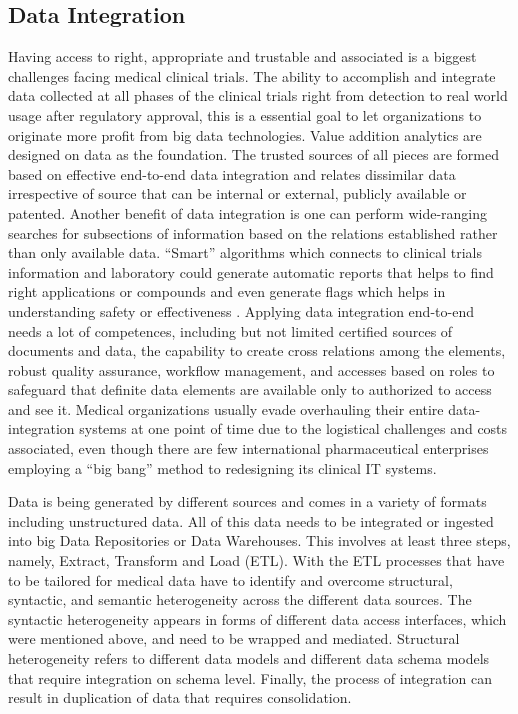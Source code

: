 \documentclass[sigconf]{acmart}
\begin{document}
\subsection{Data Integration}
Having access to right, appropriate and trustable and associated is a 
biggest challenges facing medical clinical trials. The
ability to accomplish and integrate data collected at all phases of the
clinical trials right from detection to real world usage after regulatory 
approval, this is a essential goal to let organizations to originate
more profit from big data technologies. Value addition analytics are designed
on data as the foundation.  The trusted sources of all pieces are formed 
based on effective end-to-end data integration and relates dissimilar data
irrespective of source that can be internal or external, publicly available or patented.
Another benefit of data integration is one can perform wide-ranging 
searches for subsections of information based on the relations established 
rather than only available data.  ``Smart'' algorithms which connects 
to clinical trials information and laboratory could generate automatic
reports that helps to find right applications or compounds and even 
generate flags which helps in understanding safety or effectiveness
\cite{TR02}.
Applying data integration end-to-end needs a lot of competences,
including but not limited certified sources of documents
and data, the capability to create cross relations among the elements, 
robust quality assurance, workflow management, and accesses based 
on roles to safeguard that definite data elements are available only 
to authorized to access and see it. Medical organizations usually evade
overhauling their entire data-integration systems at one point of time
due to the logistical challenges and costs associated, even though
there are few  international pharmaceutical enterprises employing 
a ``big bang'' method to redesigning its clinical IT systems\cite{TR02}.


Data is being generated by different sources and comes in a variety
of formats including unstructured data. All of this data needs to 
be integrated or ingested into big Data Repositories or Data 
Warehouses. This involves at least three steps, namely, Extract, 
Transform and Load (ETL). With the ETL processes that have to be 
tailored for medical data have to identify and overcome structural,
syntactic, and semantic heterogeneity across the different data 
sources. The syntactic heterogeneity appears in forms of different 
data access interfaces, which were mentioned above, and need to be
wrapped and mediated. Structural heterogeneity refers to different
data models and different data schema models that require 
integration on schema level. Finally, the process of integration 
can result in duplication of data that requires consolidation\cite{TR04}.
\end{document}
